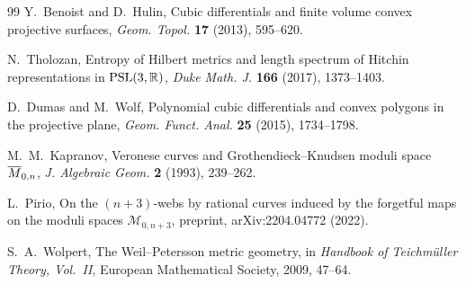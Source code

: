 \documentclass[11pt,a4paper]{ltjsarticle}
\theoremstyle{plain}
\theoremstyle{definition}
\theoremstyle{remark}
\begin{document}
\begin{thebibliography}{99}
Y.~Benoist and D.~Hulin,
\newblock Cubic differentials and finite volume convex projective surfaces,
\newblock \emph{Geom. Topol.} \textbf{17} (2013), 595--620.

N.~Tholozan,
\newblock Entropy of Hilbert metrics and length spectrum of Hitchin representations in $\mathrm{PSL}(3,\mathbb R)$,
\newblock \emph{Duke Math. J.} \textbf{166} (2017), 1373--1403.

D.~Dumas and M.~Wolf,
\newblock Polynomial cubic differentials and convex polygons in the projective plane,
\newblock \emph{Geom. Funct. Anal.} \textbf{25} (2015), 1734--1798.

M.~M.~Kapranov,
\newblock Veronese curves and Grothendieck--Knudsen moduli space $\overline M_{0,n}$,
\newblock \emph{J. Algebraic Geom.} \textbf{2} (1993), 239--262.

L.~Pirio,
\newblock On the $(n+3)$-webs by rational curves induced by the forgetful maps on the moduli spaces $\mathcal M_{0,n+3}$,
\newblock preprint, arXiv:2204.04772 (2022).

S.~A.~Wolpert,
\newblock The Weil--Petersson metric geometry,
\newblock in \emph{Handbook of Teichm\"uller Theory, Vol.~II}, European Mathematical Society, 2009, 47--64.

\end{thebibliography}
\end{document}
